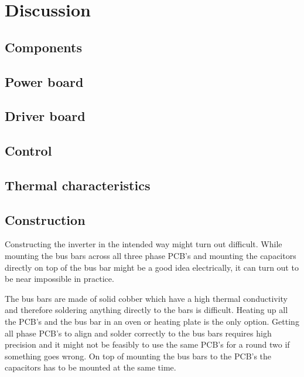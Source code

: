 \section{Discussion}
\label{sec:discussion}
 


\subsection{Components}

\subsection{Power board}

\subsection{Driver board}

\subsection{Control}

\subsection{Thermal characteristics}


\subsection{Construction}
Constructing the inverter in the intended way might turn out difficult. While mounting the bus bars across all three phase PCB's and mounting the capacitors directly on top of the bus bar might be a good idea electrically, it can turn out to be near impossible in practice.

The bus bars are made of solid cobber which have a high thermal conductivity and therefore soldering anything directly to the bars is difficult. Heating up all the PCB's and the bus bar in an oven or heating plate is the only option. 
Getting all phase PCB's to align and solder correctly to the bus bars requires high precision and it might not be feasibly to use the same PCB's for a round two if something goes wrong.
On top of mounting the bus bars to the PCB's the capacitors has to be mounted at the same time. 


